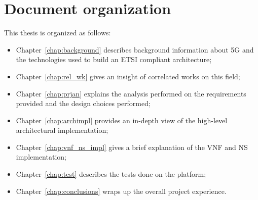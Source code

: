 \section*{Document organization}
 
This thesis is organized as follows:
\begin{itemize}
 \item Chapter~\ref{chap:background} describes background information about 5G
   and the technologies used to build an ETSI compliant architecture;
 \item Chapter~\ref{chap:rel_wk} gives an insight of correlated works on this
   field;
 \item Chapter~\ref{chap:prjan} explains the analysis performed on the
   requirements provided and the design choices performed;
 \item Chapter~\ref{chap:archimpl} provides an in-depth view of the high-level
   architectural implementation;
 \item Chapter~\ref{chap:vnf_ns_impl} gives a brief explanation of the VNF and NS
   implementation;
 \item Chapter~\ref{chap:test} describes the tests done on the platform;
 \item Chapter~\ref{chap:conclusions} wraps up the overall project experience.
\end{itemize}
